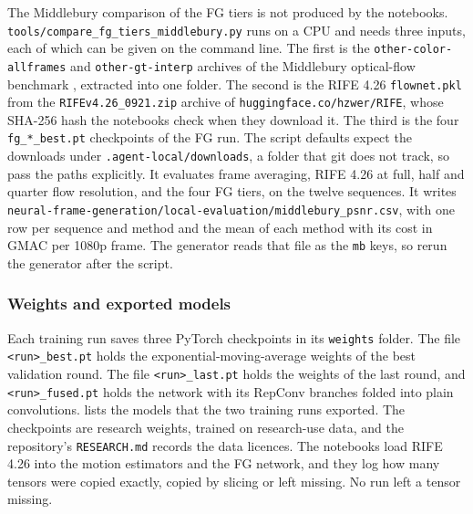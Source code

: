 The Middlebury comparison of the FG tiers is not produced by the notebooks. \texttt{tools/compare\_fg\_tiers\_middlebury.py} runs on a CPU and needs three inputs, each of which can be given on the command line. The first is the \texttt{other-color-allframes} and \texttt{other-gt-interp} archives of the Middlebury optical-flow benchmark \cite{baker2011middlebury}, extracted into one folder. The second is the RIFE 4.26 \texttt{flownet.pkl} from the \texttt{RIFEv4.26\_0921.zip} archive of \texttt{huggingface.co/hzwer/RIFE}, whose SHA-256 hash the notebooks check when they download it. The third is the four \texttt{fg\_*\_best.pt} checkpoints of the FG run. The script defaults expect the downloads under \texttt{.agent-local/downloads}, a folder that git does not track, so pass the paths explicitly. It evaluates frame averaging, RIFE 4.26 at full, half and quarter flow resolution, and the four FG tiers, on the twelve sequences. It writes \texttt{neural-frame-generation/local-evaluation/middlebury\_psnr.csv}, with one row per sequence and method and the mean of each method with its cost in GMAC per 1080p frame. The generator reads that file as the \texttt{mb} keys, so rerun the generator after the script.

\subsubsection{Weights and exported models}\label{sec:app-weights}

Each training run saves three PyTorch checkpoints in its \texttt{weights} folder. The file \texttt{<run>\_best.pt} holds the exponential-moving-average weights of the best validation round. The file \texttt{<run>\_last.pt} holds the weights of the last round, and \texttt{<run>\_fused.pt} holds the network with its RepConv branches folded into plain convolutions.  lists the models that the two training runs exported. The checkpoints are research weights, trained on research-use data, and the repository's \texttt{RESEARCH.md} records the data licences. The notebooks load RIFE 4.26 \cite{huang2022rife} into the motion estimators and the FG network, and they log how many tensors were copied exactly, copied by slicing or left missing. No run left a tensor missing.

